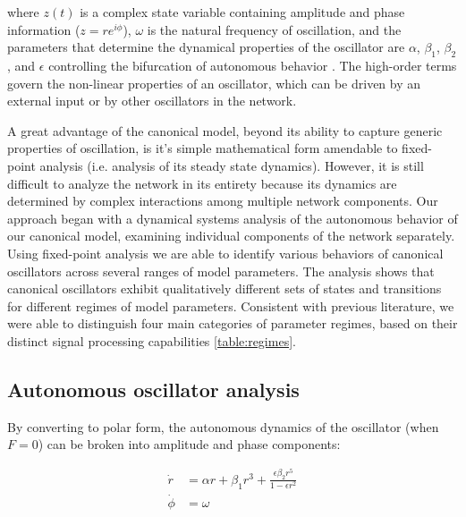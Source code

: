 \documentclass{article}
\begin{document}

where $z(t)$ is a complex state variable containing amplitude and phase information ($z = re^{i\phi}$), $\omega$ is the natural frequency of oscillation, and the parameters that determine the dynamical properties of the oscillator are $\alpha$, $\beta_1$, $\beta_2$, and $\epsilon$ controlling the bifurcation of autonomous behavior \cite{large2010canonical}\cite{kim2015signal}.  The high-order terms govern the non-linear properties of an oscillator, which can be driven by an external input or by other oscillators in the network. 

A great advantage of the canonical model, beyond its ability to capture generic properties of oscillation, is it's simple mathematical form amendable to fixed-point analysis (i.e. analysis of its steady state dynamics). However, it is still difficult to analyze the network in its entirety because its dynamics are determined by complex interactions among multiple network components.  Our approach began with a dynamical systems analysis of the autonomous behavior of our canonical model, examining individual components of the network separately. Using fixed-point analysis we are able to identify various behaviors of canonical oscillators across several ranges of model parameters. The analysis shows that canonical oscillators exhibit qualitatively different sets of states and transitions for different regimes of model parameters. Consistent with previous literature, we were able to distinguish four main categories of parameter regimes, based on their distinct signal processing capabilities \ref{table:regimes}.

\subsection{Autonomous oscillator analysis}
By converting to polar form, the autonomous dynamics of the oscillator (when $F = 0$) can be broken into amplitude and phase components:

\begin{align}
\dot{r} &= \alpha r + \beta_1 r^3 + \frac{\epsilon\beta_2 r^5}{1-\epsilon r^2} \\
\dot{\phi} &= \omega
\end{align}
\end{document}
